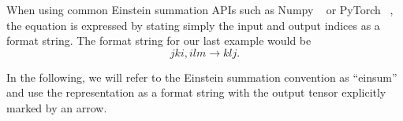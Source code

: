 \noindent When using common Einstein summation APIs such as Numpy ~\cite{Numpy} or PyTorch ~\cite{PyTorch}, the equation is expressed by stating simply the input and output indices as a format string. The format string for our last example would be
$$jki, ilm \rightarrow klj.$$

\noindent In the following, we will refer to the Einstein summation convention as ``einsum'' and use the representation as a format string with the output tensor explicitly marked by an arrow.
